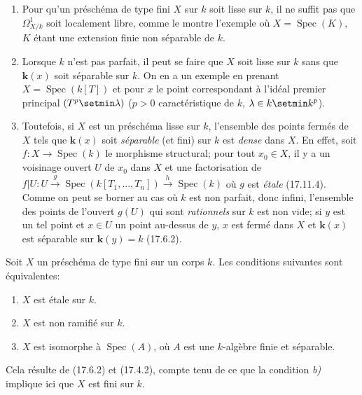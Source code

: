 \begin{remarks}[17.15.10]
\label{IV.17.15.10}
\begin{enumerate}
  \item[(i)] Pour qu'un préschéma de type fini $X$ sur $k$ soit lisse sur $k$, il ne suffit pas que $\varOmega^1_{X/k}$ soit localement libre, comme le montre l'exemple où $X=\operatorname{Spec}(K)$, $K$ étant une extension finie non séparable de $k$.
  \item[(ii)] Lorsque $k$ n'est pas parfait, il peut se faire que $X$ soit lisse sur $k$ sans que $\boldsymbol{k}(x)$ soit séparable sur $k$. On en a un exemple en prenant $X=\operatorname{Spec}(k[T])$ et pour $x$ le point correspondant à l'idéal premier principal $(T^p\setmin\lambda)$ ($p>0$ caractéristique de $k$, $\lambda\in k\setmin k^p$).
  \item[(iii)] Toutefois, si $X$ est un préschéma lisse sur $k$, l'ensemble des points fermés de $X$ tels que $\boldsymbol{k}(x)$ soit \emph{séparable} (et fini) sur $k$ est \emph{dense} dans $X$. En effet, soit $f:X\to\operatorname{Spec}(k)$ le morphisme structural; pour tout $x_0\in X$, il y a un voisinage ouvert $U$ de $x_0$ dans $X$ et une factorisation de $f|U:U\xrightarrow{g}\operatorname{Spec}(k[T_1,\ldots,T_n])\xrightarrow{h}\operatorname{Spec}(k)$ où $g$ est \emph{étale} (17.11.4). Comme on peut se borner au cas où $k$ est non parfait, donc infini, l'ensemble des points de l'ouvert $g(U)$ qui sont \emph{rationnels} sur $k$ est non vide; si $y$ est un tel point et $x\in U$ un point au-dessus de $y$, $x$ est fermé dans $X$ et $\boldsymbol{k}(x)$ est séparable sur $\boldsymbol{k}(y)=k$ (17.6.2).
\end{enumerate}
\end{remarks}

\begin{proposition}[17.15.11]
\label{IV.17.15.11}
Soit $X$ un préschéma de type fini sur un corps $k$. Les conditions suivantes sont équivalentes:
\begin{enumerate}
  \item[\textup{a)}] $X$ est étale sur $k$.
  \item[\textup{b)}] $X$ est non ramifié sur $k$.
  \item[\textup{c)}] $X$ est isomorphe à $\operatorname{Spec}(A)$, où $A$ est une $k$-algèbre finie et séparable.
\end{enumerate}
\end{proposition}

Cela résulte de (17.6.2) et (17.4.2), compte tenu de ce que la condition \emph{b)} implique ici que $X$ est fini sur $k$.

